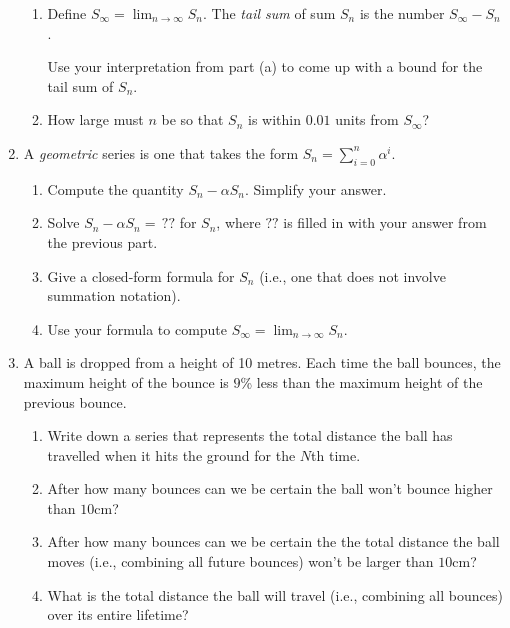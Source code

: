 \begin{enumerate}
\begin{enumerate}
            \item Define $S_\infty=\lim_{n\to\infty}S_n$. The \emph{tail sum} of sum $S_n$
			is the number $S_\infty - S_n$. 

			Use your interpretation from part (a) to come up with a bound for the tail sum of $S_n$.

            \item How large must $n$ be so that $S_n$ is within $0.01$ units from $S_\infty$?
		\end{enumerate}

		\item A \emph{geometric} series is one that takes the form $\displaystyle S_n=\sum_{i=0}^n \alpha^i$.
		\begin{enumerate}
			\item Compute the quantity $S_n-\alpha S_n$. Simplify your answer.
			\item Solve $S_n-\alpha S_n=\,??$ for $S_n$, where $??$ is filled in with your answer from the previous part. 
			\item Give a closed-form formula for $S_n$ (i.e., one that does not involve summation notation).
			\item Use your formula to compute $S_\infty =\lim_{n\to\infty} S_n$.
		\end{enumerate}

        \item A ball is dropped from a height of 10 metres. Each time the ball bounces, the maximum height of the bounce is $9$\% less than the maximum height of the previous bounce. 
        
        \begin{enumerate}
            \item Write down a series that represents the total distance the ball has travelled when it hits the ground for the $N$th time. 
            \item After how many bounces can we be certain the ball won't bounce higher than $10$cm?
            \item After how many bounces can we be certain the the total distance the ball moves (i.e., combining all future bounces) won't be larger than $10$cm?
            \item What is the total distance the ball will travel (i.e., combining all bounces)
			over its entire lifetime?
        \end{enumerate}

\end{enumerate}